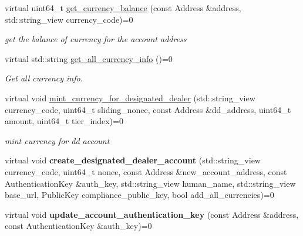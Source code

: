 \begin{DoxyCompactItemize}
virtual uint64\+\_\+t \hyperlink{classviolas_1_1_client_a7e5c7f111c7b04a3b33fd4c52c9a7abb}{get\+\_\+currency\+\_\+balance} (const Address \&address, std\+::string\+\_\+view currency\+\_\+code)=0
\begin{DoxyCompactList}\small\item\em get the balance of currency for the account address \end{DoxyCompactList}\item 
\mbox{\label{classviolas_1_1_client_a1b50ea2c7802fd82bcc51f0c4eb642e4}} 
virtual std\+::string \hyperlink{classviolas_1_1_client_a1b50ea2c7802fd82bcc51f0c4eb642e4}{get\+\_\+all\+\_\+currency\+\_\+info} ()=0
\begin{DoxyCompactList}\small\item\em Get all currency info. \end{DoxyCompactList}\item 
\mbox{\label{classviolas_1_1_client_a8538c57fa4d566909c0a3c3b1bd7009f}} 
virtual void \hyperlink{classviolas_1_1_client_a8538c57fa4d566909c0a3c3b1bd7009f}{mint\+\_\+currency\+\_\+for\+\_\+designated\+\_\+dealer} (std\+::string\+\_\+view currency\+\_\+code, uint64\+\_\+t sliding\+\_\+nonce, const Address \&dd\+\_\+address, uint64\+\_\+t amount, uint64\+\_\+t tier\+\_\+index)=0
\begin{DoxyCompactList}\small\item\em mint currency for dd account \end{DoxyCompactList}\item 
\mbox{\label{classviolas_1_1_client_af09de0629e5a22ac416d4c5a9f62deee}} 
virtual void {\bfseries create\+\_\+designated\+\_\+dealer\+\_\+account} (std\+::string\+\_\+view currency\+\_\+code, uint64\+\_\+t nonce, const Address \&new\+\_\+account\+\_\+address, const Authentication\+Key \&auth\+\_\+key, std\+::string\+\_\+view human\+\_\+name, std\+::string\+\_\+view base\+\_\+url, Public\+Key compliance\+\_\+public\+\_\+key, bool add\+\_\+all\+\_\+currencies)=0
\item 
\mbox{\label{classviolas_1_1_client_ae0b8cd2e5d65f6cc34dc6b923fde2010}} 
virtual void {\bfseries update\+\_\+account\+\_\+authentication\+\_\+key} (const Address \&address, const Authentication\+Key \&auth\+\_\+key)=0
\item 

\end{DoxyCompactItemize}
